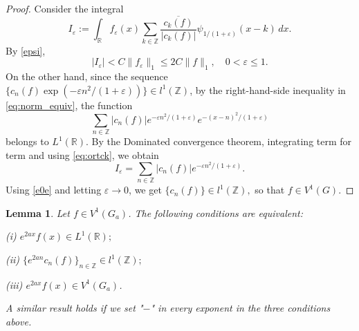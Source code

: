 \documentclass[12pt]{amsart}
\numberwithin{equation}{section}
\theoremstyle{plain}
\newtheorem{lemma}[theorem]{Lemma}
\theoremstyle{definition}
\newcommand{\R}{{\mathbb R}} \newcommand{\Q}{{\mathbb Q}} \newcommand{\Z}{{\mathbb Z}} \newcommand{\N}{{\mathbb N}}
\begin{document}
\begin{proof}
Consider the integral $$I_{\varepsilon}:=\int_\R f_\varepsilon(x)\sum_{k\in\Z}\frac{\overline{c_k(f)}}{|c_k(f)|}\psi_{1/(1+\varepsilon)}(x-k)\,dx.$$By \eqref{epsi}, 
\begin{equation}\label{e0e}|I_\varepsilon|<C\|f_\varepsilon\|_1\leq 2C\|f\|_1,\quad 0<\varepsilon\leq 1.\end{equation} On the other hand, since  the sequence $\{c_n(f)\exp(-\varepsilon n^2/(1+\varepsilon))\}\in l^1(\Z)$, by the right-hand-side inequality in \eqref{eq:norm_equiv}, the function  $$\sum_{n\in\Z}|c_n(f)|e^{-\varepsilon n^2/(1+\varepsilon)}e^{-(x-n)^2/(1+\varepsilon)}$$belongs to $L^1(\R).$ By the Dominated convergence theorem, integrating term for term  and using \eqref{eq:ortck}, we obtain $$I_\varepsilon =\sum_{n\in\Z}|c_n(f)|e^{-\varepsilon n^2/(1+\varepsilon)}.$$ Using \eqref{e0e} and  letting $\varepsilon \to 0$, we get $\{c_n(f)\}\in l^1(\Z),$ so that $f\in V^1(G).$
\end{proof}

\begin{lemma}\label{lcl}Let $f\in V^1(G_a)$. The following conditions are equivalent:

{\rm(i)} $e^{2ax}f(x)\in L^1(\R);$

{\rm(ii)} $\{e^{2an}c_n(f)\}_{n\in\Z}\in l^1(\Z);$ 

{\rm(iii)} $e^{2ax}f(x)\in V^1(G_a)$.

 A similar result holds if we set "$-$" in every exponent in the three conditions above.
   
\end{lemma}
\end{document}
